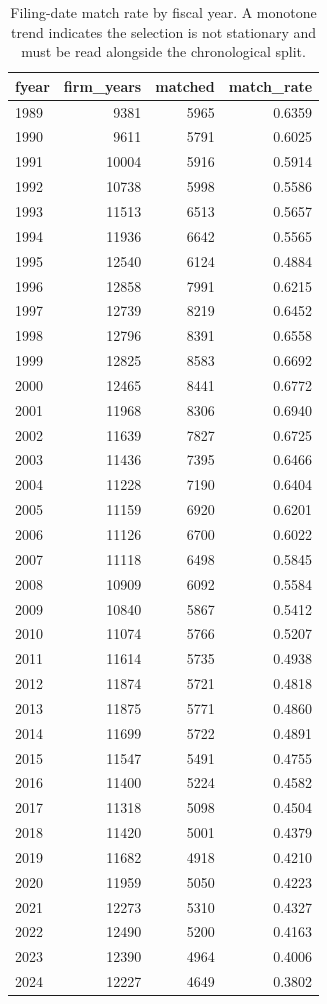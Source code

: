 \begin{table}[htbp]
\centering
\caption{Filing-date match rate by fiscal year. A monotone trend indicates the selection is not stationary and must be read alongside the chronological split.}
\label{tab:filing_date_selection_by_year}
\small
\begin{tabular}{lrrr}
\toprule
fyear & firm\_years & matched & match\_rate \\
\midrule
1989 & 9381 & 5965 & 0.6359 \\
1990 & 9611 & 5791 & 0.6025 \\
1991 & 10004 & 5916 & 0.5914 \\
1992 & 10738 & 5998 & 0.5586 \\
1993 & 11513 & 6513 & 0.5657 \\
1994 & 11936 & 6642 & 0.5565 \\
1995 & 12540 & 6124 & 0.4884 \\
1996 & 12858 & 7991 & 0.6215 \\
1997 & 12739 & 8219 & 0.6452 \\
1998 & 12796 & 8391 & 0.6558 \\
1999 & 12825 & 8583 & 0.6692 \\
2000 & 12465 & 8441 & 0.6772 \\
2001 & 11968 & 8306 & 0.6940 \\
2002 & 11639 & 7827 & 0.6725 \\
2003 & 11436 & 7395 & 0.6466 \\
2004 & 11228 & 7190 & 0.6404 \\
2005 & 11159 & 6920 & 0.6201 \\
2006 & 11126 & 6700 & 0.6022 \\
2007 & 11118 & 6498 & 0.5845 \\
2008 & 10909 & 6092 & 0.5584 \\
2009 & 10840 & 5867 & 0.5412 \\
2010 & 11074 & 5766 & 0.5207 \\
2011 & 11614 & 5735 & 0.4938 \\
2012 & 11874 & 5721 & 0.4818 \\
2013 & 11875 & 5771 & 0.4860 \\
2014 & 11699 & 5722 & 0.4891 \\
2015 & 11547 & 5491 & 0.4755 \\
2016 & 11400 & 5224 & 0.4582 \\
2017 & 11318 & 5098 & 0.4504 \\
2018 & 11420 & 5001 & 0.4379 \\
2019 & 11682 & 4918 & 0.4210 \\
2020 & 11959 & 5050 & 0.4223 \\
2021 & 12273 & 5310 & 0.4327 \\
2022 & 12490 & 5200 & 0.4163 \\
2023 & 12390 & 4964 & 0.4006 \\
2024 & 12227 & 4649 & 0.3802 \\
\bottomrule
\end{tabular}
\end{table}
